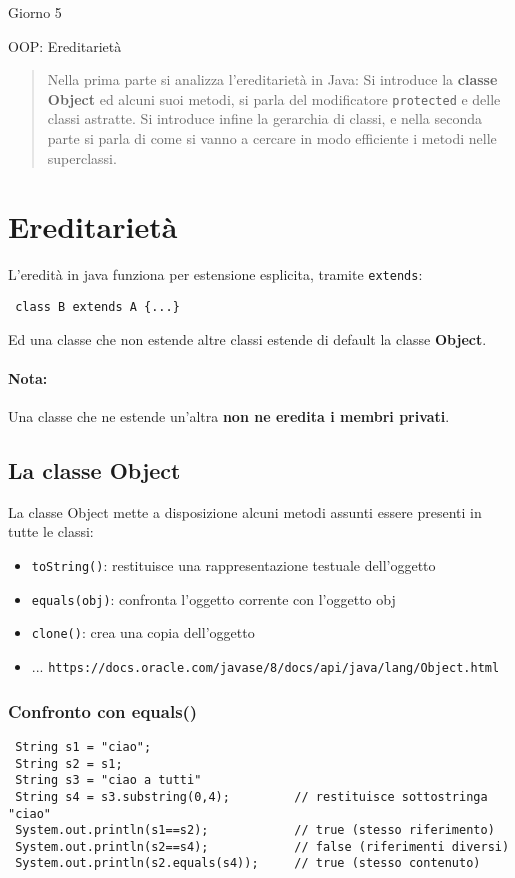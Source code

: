 \documentclass[a4paper,10pt]{article}
\begin{document}
\begin{center}
    \LARGE Giorno 5\smallskip

    \Large OOP: Ereditarietà
\end{center}\smallskip

\begin{abstract}
 Nella prima parte si analizza l'ereditarietà in Java: Si introduce la \textbf{classe Object} ed alcuni suoi metodi, si parla del modificatore \texttt{protected} e delle classi astratte. Si introduce infine la gerarchia di classi, e nella seconda parte si parla di come si vanno a cercare in modo efficiente i metodi nelle superclassi.
\end{abstract}

\section{Ereditarietà}
L'eredità in java funziona per estensione esplicita, tramite \texttt{extends}:
\begin{lstlisting}
 class B extends A {...}
\end{lstlisting}
Ed una classe che non estende altre classi estende di default la classe \textbf{Object}.

\paragraph{Nota:} Una classe che ne estende un'altra \textbf{non ne eredita i membri privati}.

\subsection{La classe Object}
La classe Object mette a disposizione alcuni metodi assunti essere presenti in tutte le classi:
\begin{itemize}
 \item \texttt{toString()}: restituisce una rappresentazione testuale dell’oggetto
 \item \texttt{equals(obj)}: confronta l’oggetto corrente con l’oggetto obj
 \item \texttt{clone()}: crea una copia dell’oggetto
 \item ... \texttt{https://docs.oracle.com/javase/8/docs/api/java/lang/Object.html}
\end{itemize}

\subsubsection{Confronto con equals()}
\begin{lstlisting}
 String s1 = "ciao";
 String s2 = s1;
 String s3 = "ciao a tutti"
 String s4 = s3.substring(0,4);         // restituisce sottostringa "ciao"
 System.out.println(s1==s2);            // true (stesso riferimento)
 System.out.println(s2==s4);            // false (riferimenti diversi)
 System.out.println(s2.equals(s4));     // true (stesso contenuto)
\end{lstlisting}
\end{document}
